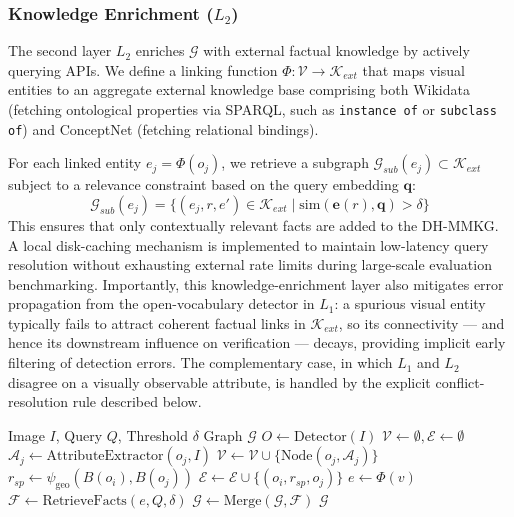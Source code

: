 \subsubsection{Knowledge Enrichment ($L_2$)}
The second layer $L_2$ enriches $\mathcal{G}$ with external factual knowledge by actively querying APIs. We define a linking function $\Phi: \mathcal{V} \to \mathcal{K}_{ext}$ that maps visual entities to an aggregate external knowledge base comprising both Wikidata (fetching ontological properties via SPARQL, such as \texttt{instance of} or \texttt{subclass of}) and ConceptNet (fetching relational bindings).

For each linked entity $e_j = \Phi(o_j)$, we retrieve a subgraph $\mathcal{G}_{sub}(e_j) \subset \mathcal{K}_{ext}$ subject to a relevance constraint based on the query embedding $\mathbf{q}$:
\begin{equation}
\mathcal{G}_{sub}(e_j) = \{ (e_j, r, e') \in \mathcal{K}_{ext} \mid \text{sim}(\mathbf{e}(r), \mathbf{q}) > \delta \}
\end{equation}
This ensures that only contextually relevant facts are added to the DH-MMKG. A local disk-caching mechanism is implemented to maintain low-latency query resolution without exhausting external rate limits during large-scale evaluation benchmarking. Importantly, this knowledge-enrichment layer also mitigates error propagation from the open-vocabulary detector in $L_1$: a spurious visual entity typically fails to attract coherent factual links in $\mathcal{K}_{ext}$, so its connectivity --- and hence its downstream influence on verification --- decays, providing implicit early filtering of detection errors. The complementary case, in which $L_1$ and $L_2$ disagree on a visually observable attribute, is handled by the explicit conflict-resolution rule described below.

\begin{algorithm}
\caption{DH-MMKG Construction Algorithm}
\label{alg:dh_mmkg}
\begin{algorithmic}[1]
\Require Image $I$, Query $Q$, Threshold $\delta$
\Ensure Graph $\mathcal{G}$
\State $O \leftarrow \text{Detector}(I)$
\State $\mathcal{V} \leftarrow \emptyset, \mathcal{E} \leftarrow \emptyset$
    \State $\mathcal{A}_j \leftarrow \text{AttributeExtractor}(o_j, I)$
    \State $\mathcal{V} \leftarrow \mathcal{V} \cup \{ \text{Node}(o_j, \mathcal{A}_j) \}$
\EndFor
{}
    \State $r_{sp} \leftarrow \psi_{\text{geo}}(B(o_i), B(o_j))$
    \State $\mathcal{E} \leftarrow \mathcal{E} \cup \{ (o_i, r_{sp}, o_j) \}$
\EndFor
{}
    \State $e \leftarrow \Phi(v)$
    \State $\mathcal{F} \leftarrow \text{RetrieveFacts}(e, Q, \delta)$
    \State $\mathcal{G} \leftarrow \text{Merge}(\mathcal{G}, \mathcal{F})$
\EndFor
\State \Return $\mathcal{G}$
\end{algorithmic}
\end{algorithm}

